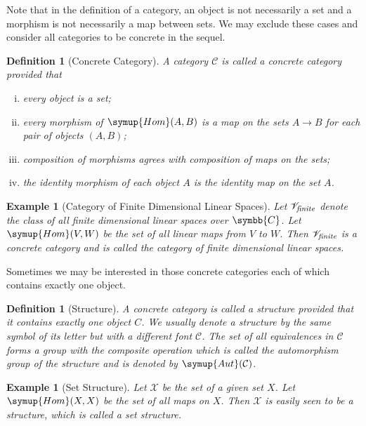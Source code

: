 \documentclass{assignment}[2019/10/15]
\theoremstyle{plain}
\newtheorem{definition}[theorem]{Definition}
\newtheorem{example}[theorem]{Example}
\newcommand{\SC}{\mathscr{C}}
\newcommand{\BC}{\symbb{C}}
\newcommand{\Hom}{\mathop{}\!\symup{Hom}}
\newcommand{\Aut}{\mathop{}\!\symup{Aut}}
\begin{document}
    Note that in the definition of a category, an object is not necessarily a set and a morphism is not necessarily a map between sets. We may exclude these cases and consider all categories to be concrete in the sequel.

    \begin{definition}[Concrete Category]
        A category $\SC$ is called a \emph{concrete category} provided that
        \begin{enumerate}[(i)]
            \item every object is a set;
            \item every morphism of $\Hom(A, B)$ is a map on the sets $A\to B$ for each pair of objects $(A, B)$;
            \item composition of morphisms agrees with composition of maps on the sets;
            \item the identity morphism of each object $A$ is the identity map on the set $A$.
        \end{enumerate}
    \end{definition}

    \begin{example}[Category of Finite Dimensional Linear Spaces]
        Let $\mathscr{V}_\text{\it finite}$ denote the class of all finite dimensional linear spaces over $\BC$. Let $\Hom(V, W)$ be the set of all linear maps from $V$ to $W$. Then $\mathscr{V}_\text{\it finite}$ is a concrete category and is called the \emph{category of finite dimensional linear spaces}.
    \end{example}

    Sometimes we may be interested in those concrete categories each of which contains exactly one object.

    \begin{definition}[Structure]
        A concrete category is called a \emph{structure} provided that it contains exactly one object $C$. We usually denote a structure by the same symbol of its letter but with a different font $\mathcal{C}$. The set of all equivalences in $\mathcal{C}$ forms a group with the composite operation which is called the \emph{automorphism group} of the structure and is denoted by $\Aut(\mathcal{C})$.
    \end{definition}

    \begin{example}[Set Structure]
        Let $\mathcal{X}$ be the set of a given set $X$. Let $\Hom(X, X)$ be the set of all maps on $X$. Then $\mathcal{X}$ is easily seen to be a structure, which is called a \emph{set structure}.
    \end{example}
\end{document}
